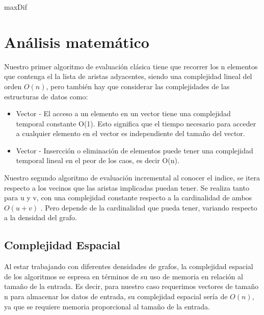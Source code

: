 \documentclass[oneside,onecolumn]{article}
\begin{document}
\begin{algorithm}
  
  \Return maxDif\;
  
\end{algorithm}

    
\newpage
\section{Análisis matemático}

Nuestro primer algoritmo de evaluación clásica tiene que recorrer los n elementos que contenga el la lista de aristas adyacentes, siendo una complejidad lineal del orden $O(n)$, pero también hay que considerar las complejidades de las estructuras de datos como:

\begin{itemize}
\item Vector - El acceso a un elemento en un vector tiene una complejidad temporal constante O(1). Esto significa que el tiempo necesario para acceder a cualquier elemento en el vector es independiente del tamaño del vector.
\item Vector - Insercción o eliminación de elementos puede tener una complejidad temporal lineal en el peor de los caos, es decir O(n).
\end{itemize}

Nuestro segundo algoritmo de evaluación incremental al conocer el indice, se itera respecto a los vecinos que las aristas implicadas puedan tener. Se realiza tanto para u y v, con una complejidad constante respecto a la cardinalidad de ambos $O(u+v)$ . Pero depende de la cardinalidad que pueda tener, variando respecto a la densidad del grafo.

\subsection{Complejidad Espacial}

Al estar trabajando con diferentes densidades de grafos, la complejidad espacial de los algoritmos se espresa en términos de su uso de memoria en relación al tamaño de la entrada. Es decir, para nuestro caso requerimos vectores de tamaño n para almacenar los datos de entrada, su complejidad espacial sería de $O(n)$, ya que se requiere memoria proporcional al tamaño de la entrada.\\
\end{document}

